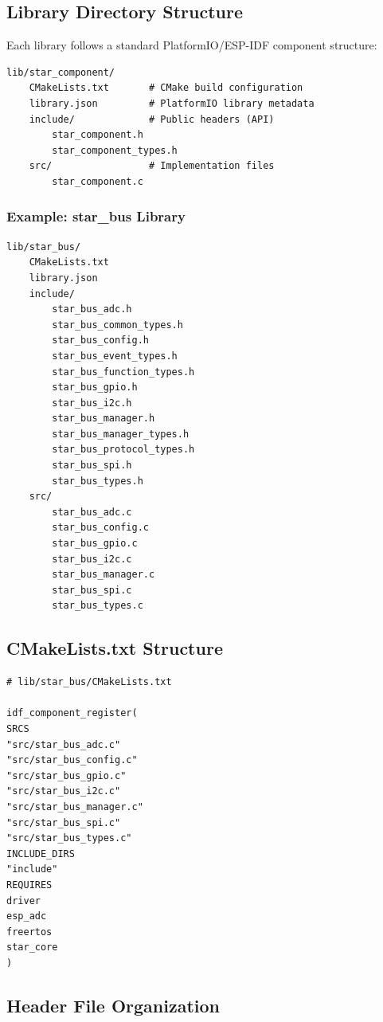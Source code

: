 \subsection{Library Directory Structure}

Each library follows a standard PlatformIO/ESP-IDF component structure:

\begin{verbatim}
lib/star_component/
    CMakeLists.txt       # CMake build configuration
    library.json         # PlatformIO library metadata
    include/             # Public headers (API)
        star_component.h
        star_component_types.h
    src/                 # Implementation files
        star_component.c
\end{verbatim}

\subsubsection{Example: star\_bus Library}

\begin{verbatim}
lib/star_bus/
    CMakeLists.txt
    library.json
    include/
        star_bus_adc.h
        star_bus_common_types.h
        star_bus_config.h
        star_bus_event_types.h
        star_bus_function_types.h
        star_bus_gpio.h
        star_bus_i2c.h
        star_bus_manager.h
        star_bus_manager_types.h
        star_bus_protocol_types.h
        star_bus_spi.h
        star_bus_types.h
    src/
        star_bus_adc.c
        star_bus_config.c
        star_bus_gpio.c
        star_bus_i2c.c
        star_bus_manager.c
        star_bus_spi.c
        star_bus_types.c
\end{verbatim}

\subsection{CMakeLists.txt Structure}

\begin{lstlisting}
# lib/star_bus/CMakeLists.txt

idf_component_register(
SRCS
"src/star_bus_adc.c"
"src/star_bus_config.c"
"src/star_bus_gpio.c"
"src/star_bus_i2c.c"
"src/star_bus_manager.c"
"src/star_bus_spi.c"
"src/star_bus_types.c"
INCLUDE_DIRS
"include"
REQUIRES
driver
esp_adc
freertos
star_core
)
\end{lstlisting}

\subsection{Header File Organization}

